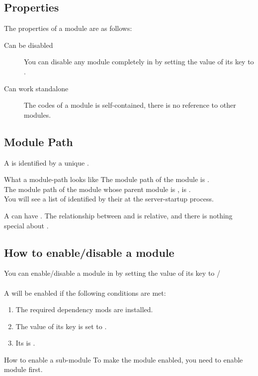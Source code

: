 \subsection{Properties}
The properties of a module are as follows:
\begin{description}
    \item [Can be disabled] You can disable any module completely in  by setting the value of its  key to .
    \item [Can work standalone] The codes of a module is self-contained, there is no reference to other modules.
\end{description}

\subsection{Module Path}
A  is identified by a unique .
\begin{example}{What a module-path looks like}
    The module path of the module  is . \\
    The module path of the module  whose parent module is , is . \\
    You will see a list of  identified by their  at the server-startup process.
\end{example}
A  can have .
The relationship between  and  is relative, and there is nothing special about .

\subsection{How to enable/disable a module}
You can enable/disable a module in  by setting the value of its  key to /
\\
\\
A  will be enabled if the following conditions are met:
\begin{enumerate}
    \item The required dependency mods are installed.
    \item The value of its  key is set to .
    \item Its  is .
\end{enumerate}

\begin{example}{How to enable a sub-module}
    To make the module  enabled, you need to enable  module first.
\end{example}
